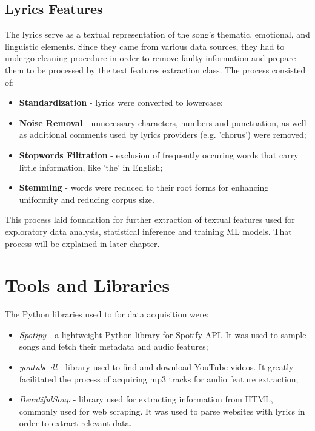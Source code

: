 \subsection{Lyrics Features}
 The lyrics serve as a textual representation of the song's thematic,
 emotional, and linguistic elements. Since they came from various data sources,
 they had  to undergo cleaning procedure in order to remove faulty information
 and prepare them to be processed by the text features extraction class. The
 process consisted of:
 \begin{itemize}
  \item \textbf{Standardization} - lyrics were converted to lowercase;
  \item \textbf{Noise Removal} - unnecessary characters, numbers and
    punctuation, as well as additional comments used by lyrics providers (e.g.
    'chorus') were removed;
  \item \textbf{Stopwords Filtration} - exclusion of frequently occuring words
    that carry little information, like 'the' in English;
  \item \textbf{Stemming} - words were reduced to their root forms for enhancing
    uniformity and reducing corpus size.
 \end{itemize}

 This process laid foundation for further extraction of textual features used
 for exploratory data analysis, statistical inference and training ML models.
 That process will be explained in later chapter.



\section{Tools and Libraries}
\label{sec:toolsandlibrariesused}
The Python libraries used to for data acquisition were\cite{spotipy, ytdl, beautifulsoup}:
\begin{itemize}
  \item \textit{Spotipy} - a lightweight Python library for Spotify API. It was
    used to sample songs and fetch their metadata and audio features;
  \item \textit{youtube-dl}  - library used to find and download YouTube
    videos. It greatly facilitated the process of acquiring mp3 tracks for
    audio feature extraction;
  \item \textit{BeautifulSoup}  - library used for extracting information from
    HTML, commonly used for web scraping. It was used to parse websites with
    lyrics in order to extract relevant data.
\end{itemize}


